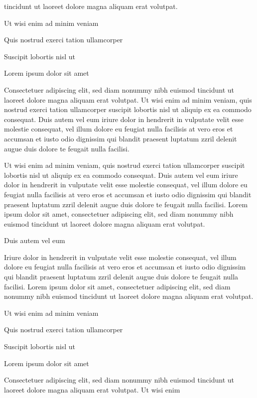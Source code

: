 \documentclass[11pt,twoside]{article}\makeatletter
\begin{document}
      tincidunt ut laoreet dolore magna aliquam erat volutpat. \par Ut wisi enim ad minim veniam\par Quis nostrud exerci tation ullamcorper \par Suscipit lobortis nisl ut \par Lorem ipsum dolor sit amet\par Consectetuer adipiscing elit, sed diam nonummy nibh euismod
      tincidunt ut laoreet dolore magna aliquam erat volutpat. Ut wisi enim
      ad minim veniam, quis nostrud exerci tation ullamcorper suscipit
      lobortis nisl ut aliquip ex ea commodo consequat. Duis autem vel eum
      iriure dolor in hendrerit in vulputate velit esse molestie consequat,
      vel illum dolore eu feugiat nulla facilisis at vero eros et accumsan
      et iusto odio dignissim qui blandit praesent luptatum zzril delenit
      augue duis dolore te feugait nulla facilisi.\par Ut wisi enim ad minim veniam, quis nostrud exerci tation
      ullamcorper suscipit lobortis nisl ut aliquip ex ea commodo
      consequat. Duis autem vel eum iriure dolor in hendrerit in vulputate
      velit esse molestie consequat, vel illum dolore eu feugiat nulla
      facilisis at vero eros et accumsan et iusto odio dignissim qui blandit
      praesent luptatum zzril delenit augue duis dolore te feugait nulla
      facilisi. Lorem ipsum dolor sit amet, consectetuer adipiscing elit,
      sed diam nonummy nibh euismod tincidunt ut laoreet dolore magna
      aliquam erat volutpat. \par Duis autem vel eum \par Iriure dolor in hendrerit in vulputate velit esse molestie
      consequat, vel illum dolore eu feugiat nulla facilisis at vero eros et
      accumsan et iusto odio dignissim qui blandit praesent luptatum zzril
      delenit augue duis dolore te feugait nulla facilisi. Lorem ipsum dolor
      sit amet, consectetuer adipiscing elit, sed diam nonummy nibh euismod
      tincidunt ut laoreet dolore magna aliquam erat volutpat. \par Ut wisi enim ad minim veniam\par Quis nostrud exerci tation ullamcorper \par Suscipit lobortis nisl ut \par Lorem ipsum dolor sit amet\par Consectetuer adipiscing elit, sed diam nonummy nibh euismod
      tincidunt ut laoreet dolore magna aliquam erat volutpat. Ut wisi enim
\end{document}
